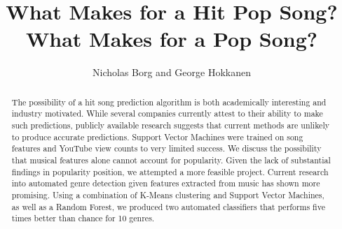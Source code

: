 \documentclass[12pt]{amsart}
\title{What Makes for a Hit Pop Song? What Makes for a Pop Song?}
\author{Nicholas Borg and George Hokkanen}
\begin{document}
\maketitle

\begin{abstract}
The possibility of a hit song prediction algorithm is both academically interesting and industry motivated. While several companies currently attest to their ability to make such predictions, publicly available research suggests that current methods are unlikely to produce accurate predictions. Support Vector Machines were trained on song features and YouTube view counts to very limited success. We discuss the possibility that musical features alone cannot account for popularity. Given the lack of substantial findings in popularity position, we attempted a more feasible project. Current research into automated genre detection given features extracted from music has shown more promising. Using a combination of K-Means clustering and Support Vector Machines, as well as a Random Forest, we produced two automated classifiers that performs five times better than chance for 10 genres. 
\end{abstract}
\end{document}

